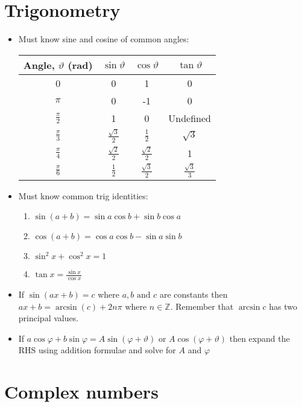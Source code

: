 \documentclass{article}
\begin{document}
\section*{Trigonometry}

\begin{itemize}
\item Must know sine and cosine of common angles:
\begin{center}
\begin{tabular}{|c|c|c|c|}\hline
Angle, \(\vartheta\) (rad) & \(\sin\vartheta\) & \(\cos\vartheta\) & \(\tan\vartheta\)\\[5 pt] \hline
0 & 0 & 1 & 0\\[5 pt] \hline
\(\pi\) & 0 & -1 & 0 \\[5 pt] \hline
\(\frac{\pi}{2}\) & 1 & 0 & Undefined \\[5 pt] \hline
\(\frac{\pi}{3}\) & \(\frac{\sqrt{3}}{2}\) & \(\frac{1}{2}\) & \(\sqrt{3}\) \\[5 pt] \hline
\(\frac{\pi}{4}\) & \(\frac{\sqrt{2}}{2}\) & \(\frac{\sqrt{2}}{2}\) & 1 \\[5 pt] \hline
\(\frac{\pi}{6}\) & \(\frac{1}{2}\) & \(\frac{\sqrt{3}}{2}\) & \(\frac{\sqrt{3}}{3}\) \\[5 pt] \hline
\end{tabular}
\end{center}
\item Must know common trig identities:
\begin{enumerate}
\item \(\sin(a+b)=\sin a \cos b +\sin b \cos a\)
\item \(\cos(a+b)=\cos a \cos b -\sin a \sin b\)
\item \(\sin^2x+\cos^2x=1\)
\item \(\tan x=\frac{\sin x}{\cos x}\)
\end{enumerate}
\item If \(\sin(ax+b)=c\) where \(a,b\text{ and }c\) are constants then \(ax+b=\arcsin(c)+2n\pi\) where \(n\in\mathbb{Z}\). Remember that \(\arcsin c\) has two principal values.
\item If \(a\cos\varphi+b\sin\varphi=A\sin(\varphi+\vartheta)\text{ or }A\cos(\varphi+\vartheta)\) then expand the RHS using addition formulae and solve for \(A\) and \(\varphi\)
\end{itemize}

\section*{Complex numbers}
\end{document}
